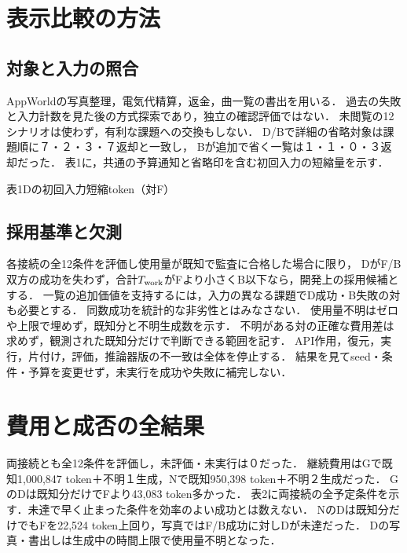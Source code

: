 \documentclass[uplatex,a4paper,twocolumn,10pt]{jsarticle}
\begin{document}
\section{表示比較の方法}


\subsection{対象と入力の照合}
AppWorld\cite{appworld}の写真整理，電気代精算，返金，曲一覧の書出を用いる．
過去の失敗と入力計数を見た後の方式探索であり，独立の確認評価ではない．
未閲覧の12シナリオは使わず，有利な課題への交換もしない．
D/Bで詳細の省略対象は課題順に７・２・３・７返却と一致し，
Bが追加で省く一覧は１・１・０・３返却だった．
表1に，共通の予算通知と省略印を含む初回入力の短縮量を示す．

\begin{center}\begin{minipage}{\columnwidth}\centering
\small 表1\quad Dの初回入力短縮token（対F）\par\smallskip
\PublicDisplayInitialSavings
\end{minipage}\end{center}

\subsection{採用基準と欠測}
各接続の全12条件を評価し使用量が既知で監査に合格した場合に限り，
DがF/B双方の成功を失わず，合計$T_{\rm work}$がFより小さくB以下なら，開発上の採用候補とする．
一覧の追加価値を支持するには，入力の異なる課題でD成功・B失敗の対も必要とする．
同数成功を統計的な非劣性とはみなさない．
使用量不明はゼロや上限で埋めず，既知分と不明生成数を示す．
不明がある対の正確な費用差は求めず，観測された既知分だけで判断できる範囲を記す．
API作用，復元，実行，片付け，評価，推論器版の不一致は全体を停止する．
結果を見てseed・条件・予算を変更せず，未実行を成功や失敗に補完しない．

\section{費用と成否の全結果}
両接続とも全12条件を評価し，未評価・未実行は０だった．
継続費用はGで既知1,000,847 token＋不明１生成，Nで既知950,398 token＋不明２生成だった．
GのDは既知分だけでFより43,083 token多かった．
表2に両接続の全予定条件を示す．未達で早く止まった条件を効率のよい成功とは数えない．
NのDは既知分だけでもFを22,524 token上回り，写真ではF/B成功に対しDが未達だった．
Dの写真・書出しは生成中の時間上限で使用量不明となった．
\end{document}
